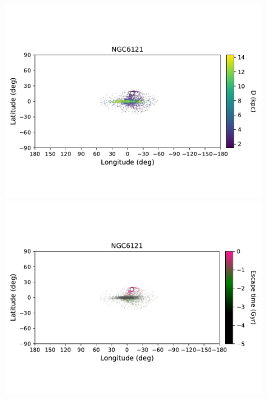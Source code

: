 \begin{figure}
\begin{center}
                    \includegraphics[clip=true, trim = 0mm 20mm 0mm 10mm, width=\columnwidth]{images/PII_individual_NGC6121_NGC6121_LB_D.pdf}
                    \includegraphics[clip=true, trim = 0mm 20mm 0mm 10mm, width=\columnwidth]{images/PII_individual_NGC6121_NGC6121_LB_tesc.pdf}
                \end{center}

\end{figure}
